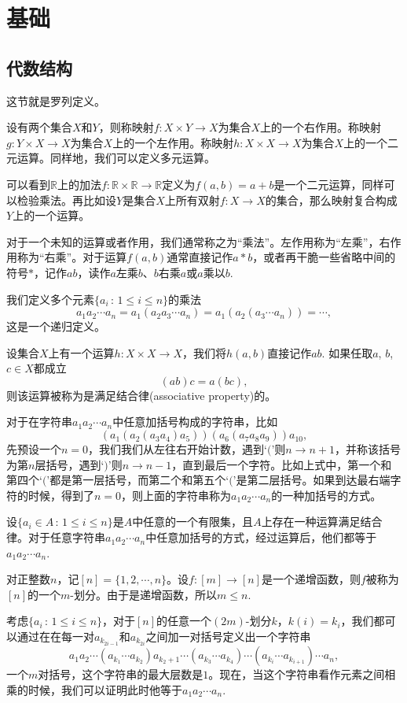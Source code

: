 \chapter{基础}

\section{代数结构}

这节就是罗列定义。

\para 设有两个集合$X$和$Y$，则称映射$f:X\times Y \to X$为集合$X$上的一个右作用。称映射$g:Y\times X \to X$为集合$X$上的一个左作用。称映射$h:X\times X \to X$为集合$X$上的一个二元运算。同样地，我们可以定义多元运算。

可以看到$\mathbb{R}$上的加法$f:\mathbb{R}\times \mathbb{R} \to \mathbb{R}$定义为$f(a,b)=a+b$是一个二元运算，同样可以检验乘法。再比如设$Y$是集合$X$上所有双射$f:X\to X$的集合，那么映射复合构成$Y$上的一个运算。

对于一个未知的运算或者作用，我们通常称之为“乘法”。左作用称为“左乘”，右作用称为“右乘”。对于运算$f(a,b)$通常直接记作$a*b$，或者再干脆一些省略中间的符号$*$，记作$ab$，读作$a$左乘$b$、$b$右乘$a$或$a$乘以$b$.

我们定义多个元素$\{a_i\,:\, 1\leq i \leq n\}$的乘法
\[
	a_1a_2\cdots a_n=a_1(a_2a_3\cdots a_n)=a_1(a_2(a_3\cdots a_n))=\cdots,
\]
这是一个递归定义。

\para 设集合$X$上有一个运算$h:X\times X \to X$，我们将$h(a,b)$直接记作$ab$. 如果任取$a$, $b$, $c\in X$都成立
\[
	(ab)c=a(bc),
\]
则该运算被称为是满足结合律(associative property)的。

\para 对于在字符串$a_1a_2\cdots a_n$中任意加括号构成的字符串，比如
\[
(a_1(a_2(a_3a_4)a_5))(a_6(a_7a_8a_9))a_{10},
\]
先预设一个$n=0$，我们我们从左往右开始计数，遇到`$($'则$n\to n+1$，并称该括号为第$n$层括号，遇到`$)$'则$n\to n-1$，直到最后一个字符。比如上式中，第一个和第四个`$($'都是第一层括号，而第二个和第五个`$($'是第二层括号。如果到达最右端字符的时候，得到了$n=0$，则上面的字符串称为$a_1a_2\cdots a_n$的一种加括号的方式。

\pro 设$\{a_i\in A\,:\, 1\leq i\leq n\}$是$A$中任意的一个有限集，且$A$上存在一种运算满足结合律。对于任意字符串$a_1a_2\cdots a_n$中任意加括号的方式，经过运算后，他们都等于$a_1a_2\cdots a_n$.

\proof 对正整数$n$，记$[n]=\{1,2,\cdots,n\}$。设$f:[m]\to [n]$是一个递增函数，则$f$被称为$[n]$的一个$m$-划分。由于是递增函数，所以$m\leq n$. 

考虑$\{a_i\, :\, 1\leq i\leq n\}$，对于$[n]$的任意一个$(2m)$-划分$k$，$k(i)=k_i$，我们都可以通过在在每一对$a_{k_{2i-1}}$和$a_{k_{2i}}$之间加一对括号定义出一个字符串
\[
	a_1a_2\cdots (a_{k_1}\cdots a_{k_2})a_{k_2+1}\cdots (a_{k_3}\cdots a_{k_4})\cdots (a_{k_i}\cdots a_{k_{i+1}})\cdots a_n,
\]
一个$m$对括号，这个字符串的最大层数是$1$。现在，当这个字符串看作元素之间相乘的时候，我们可以证明此时他等于$a_1a_2\cdots a_n$.


